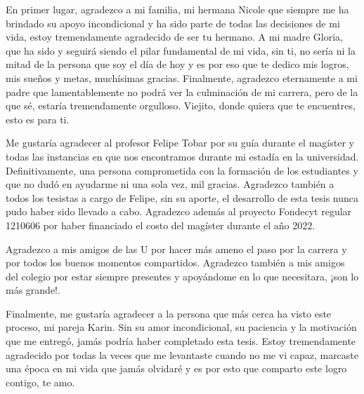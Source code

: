\documentclass[
	spanish, %
	letterpaper, oneside
]{book}
\begin{document}
\begin{acknowledgments}

En primer lugar, agradezco a mi familia, mi hermana Nicole que siempre me ha brindado su apoyo incondicional y ha sido parte de todas las decisiones de mi vida, estoy tremendamente agradecido de ser tu hermano. A mi madre Gloria, que ha sido y seguirá siendo el pilar fundamental de mi vida, sin ti, no sería ni la mitad de la persona que soy el día de hoy y es por eso que te dedico mis logros, mis sueños y metas, muchísimas gracias. Finalmente, agradezco eternamente a mi padre que lamentablemente no podrá ver la culminación de mi carrera, pero de la que sé, estaría tremendamente orgulloso. Viejito, donde quiera que te encuentres, esto es para ti. 

\vspace{0.2cm}

Me gustaría agradecer al profesor Felipe Tobar por su guía durante el magíster y todas las instancias en que nos encontramos durante mi estadía en la universidad. Definitivamente, una persona comprometida con la formación de los estudiantes y que no dudó en ayudarme ni una sola vez, mil gracias. Agradezco también a todos los tesistas a cargo de Felipe, sin su aporte, el desarrollo de esta tesis nunca pudo haber sido llevado a cabo. Agradezco además al proyecto Fondecyt regular 1210606 por haber financiado el costo del magíster durante el año 2022.

\vspace{0.2cm}

Agradezco a mis amigos de las U por hacer más ameno el paso por la carrera y por todos los buenos momentos compartidos. Agradezco también a mis amigos del colegio por estar siempre presentes y apoyándome en lo que necesitara, ¡son lo más grande!. 

\vspace{0.2cm}

Finalmente, me gustaría agradecer a la persona que más cerca ha visto este proceso, mi pareja Karin. Sin su amor incondicional, su paciencia y la motivación que me entregó, jamás podría haber completado esta tesis. Estoy tremendamente agradecido por todas la veces que me levantaste cuando no me vi capaz, marcaste una época en mi vida que jamás olvidaré y es por esto que comparto este logro contigo, te amo. 


\end{acknowledgments}

\templateIndex
\end{document}
